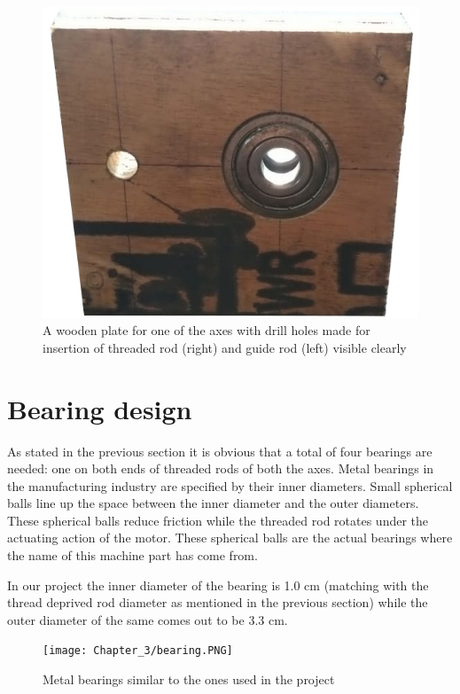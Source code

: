 \begin{figure}[h]
    \centering
    \includegraphics[scale=0.3]{images/Chapter_3/XY_plate.jpg}
    \caption{A wooden plate for one of the axes with drill holes made for insertion of threaded rod (right) and guide rod (left) visible clearly}
    \label{fig:plate}
\end{figure}

\section{Bearing design} 

As stated in the previous section it is obvious that a total of four bearings are needed: one on both ends of threaded rods of both the axes. Metal bearings in the manufacturing industry are specified by their inner diameters. Small spherical balls line up the space between the inner diameter and the outer diameters. These spherical balls reduce friction while the threaded rod rotates under the actuating action of the motor. These spherical balls are the actual bearings where the name of this machine part has come from. \par

In our project the inner diameter of the bearing is 1.0 cm (matching with the thread deprived rod diameter as mentioned in the previous section) while the outer diameter of the same comes out to be 3.3 cm.

\begin{figure}[h]
 \centering
 \texttt{[image: Chapter\_3/bearing.PNG]}
 \caption{Metal bearings similar to the ones used in the project}
 \label{fig:bearing}
\end{figure}

